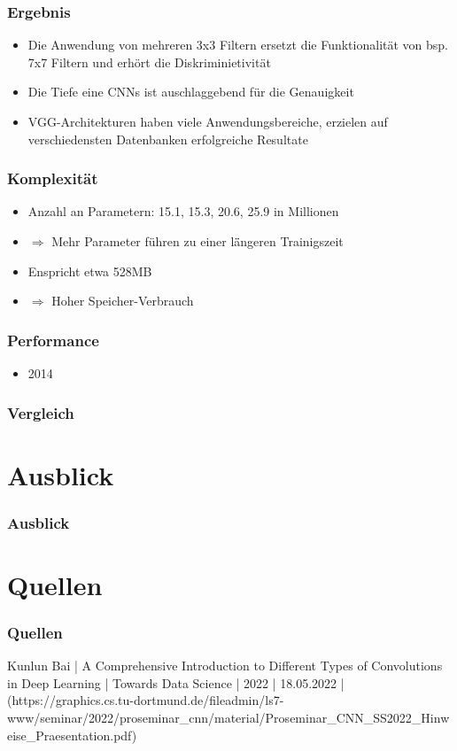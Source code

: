 \documentclass[10pt]{beamer}
\begin{document}
\begin{frame}
	\frametitle{Ergebnis}
	\begin{itemize}
		\item Die Anwendung von mehreren 3x3 Filtern ersetzt die Funktionalität von bsp. 7x7 Filtern und erh\"ort die Diskriminietivit\"at
		\item Die Tiefe eine CNNs ist auschlaggebend f\"ur die Genauigkeit
		\item VGG-Architekturen haben viele Anwendungsbereiche, erzielen auf verschiedensten Datenbanken erfolgreiche Resultate
	\end{itemize}
\end{frame}

\begin{frame}
	\frametitle{Komplexit\"at}
	\begin{itemize}
		\item Anzahl an Parametern: 15.1, 15.3, 20.6, 25.9 in Millionen
		\item[] $\Rightarrow$ Mehr Parameter f\"uhren zu einer l\"ängeren Trainigszeit
		\item Enspricht etwa 528MB
		\item[] $\Rightarrow$ Hoher Speicher-Verbrauch
	\end{itemize}
\end{frame}

\begin{frame}
	\frametitle{Performance}
	\begin{itemize}
		\item 2014 
	\end{itemize}
\end{frame}

\begin{frame}
	\frametitle{Vergleich}
\end{frame}

\section{Ausblick}
\begin{frame}
	\frametitle{Ausblick}
\end{frame}

\section{Quellen}
\begin{frame}
	\frametitle{Quellen}
	Kunlun Bai | A Comprehensive Introduction to Different Types of Convolutions in Deep Learning | Towards Data Science | 2022 | 18.05.2022 | (https://graphics.cs.tu-dortmund.de/fileadmin/ls7-www/seminar/2022/proseminar_cnn/material/Proseminar_CNN_SS2022_Hinweise_Praesentation.pdf) \\
\end{frame}
\end{document}
